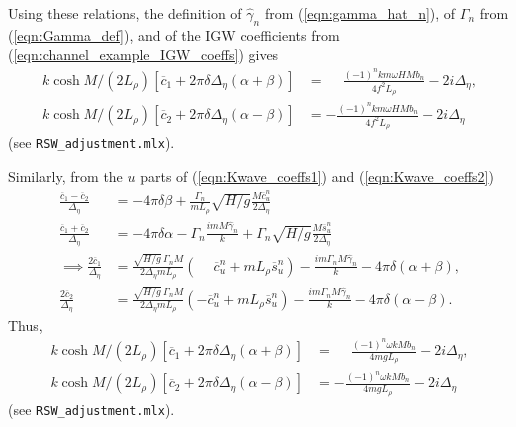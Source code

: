 \documentclass[10pt,reqno]{amsart}
\begin{document}
Using these relations, the definition of $\hat{\gamma}_n$ from (\ref{eqn:gamma_hat_n}), of $\Gamma_n$ from (\ref{eqn:Gamma_def}), and of the IGW coefficients from (\ref{eqn:channel_example_IGW_coeffs}) gives
\begin{align}
k \cosh M/(2 L_\rho) \left[ \overline{c}_1 + 2 \pi \delta \Delta_\eta \left( \alpha + \beta \right) \right] & = \phantom{-} \frac{(-1)^n k m \omega H M b_n }{4 f^2 L_\rho}  - 2 i \Delta_\eta , \nonumber \\
k \cosh M/(2 L_\rho) \left[ \overline{c}_2 + 2 \pi \delta \Delta_\eta \left( \alpha - \beta \right) \right] & = - \frac{(-1)^n k m \omega H M b_n }{4 f^2 L_\rho}  - 2 i \Delta_\eta 
\label{eqn:c1c2_bar} 
\end{align}
(see \texttt{RSW\_adjustment.mlx}).

Similarly, from the $u$ parts of (\ref{eqn:Kwave_coeffs1}) and (\ref{eqn:Kwave_coeffs2})
\begin{align}
\frac{\overline{c}_1 - \overline{c}_2}{\Delta_\eta}  & = - 4 \pi \delta \beta + \frac{\Gamma_n}{m L_\rho} \sqrt{H/g} \frac{M \overline{c}_u^{n}}{2 \Delta_\eta} \\
\frac{\overline{c}_1 + \overline{c}_2}{\Delta_\eta}  & = - 4 \pi \delta \alpha - \Gamma_n \frac{i m  M \hat{\gamma}_n}{k} + \Gamma_n \sqrt{H/g}  \frac{M  \overline{s}_u^n}{2\Delta_\eta}  \\
\implies
\frac{2 \overline{c}_1 }{\Delta_\eta} & =
\frac{\sqrt{H/g}\, \Gamma_n M}{2 \Delta_\eta m L_\rho} \left(\phantom{-}\overline{c}_u^{n} + m L_\rho \overline{s}_u^n \right)  - \frac{i m \Gamma_n M \hat{\gamma}_n}{k} - 4 \pi \delta \left( \alpha + \beta \right) , \\
\frac{2 \overline{c}_2}{\Delta_\eta} &= 
\frac{\sqrt{H/g}\, \Gamma_n M}{2 \Delta_\eta m L_\rho} \left(-\overline{c}_u^{n} + m L_\rho \overline{s}_u^n \right)  - \frac{i m \Gamma_n M \hat{\gamma}_n}{k} - 4 \pi \delta \left( \alpha - \beta \right) .
\end{align}
Thus,
\begin{align}
k \cosh M/(2 L_\rho) \left[ \overline{c}_1 + 2 \pi \delta \Delta_\eta \left( \alpha + \beta \right) \right] & = \phantom{-} \frac{(-1)^n \omega k M b_n }{4 m g L_\rho}  - 2 i \Delta_\eta , \nonumber \\
k \cosh M/(2 L_\rho) \left[ \overline{c}_2 + 2 \pi \delta \Delta_\eta \left( \alpha - \beta \right) \right] & = - \frac{(-1)^n \omega k M b_n }{4 m g L_\rho} - 2 i \Delta_\eta 
\label{eqn:c1c2_bar_b} 
\end{align}
(see \texttt{RSW\_adjustment.mlx}).
\end{document}
